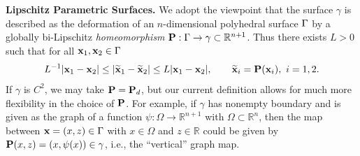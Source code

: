 \noindent
{\bf Lipschitz Parametric Surfaces.}
We adopt the viewpoint that the surface $\gamma$ is described as the deformation of an
$n$-dimensional polyhedral surface $\Gamma$ by a globally bi-Lipschitz
\emph{homeomorphism} ${\bf P}:\Gamma \rightarrow \gamma \subset \mathbb
R^{n+1}$. 
Thus there exists $L>0$ such that for all ${\bf x}_1, {\bf x}_2 \in \Gamma$
\begin{equation}
\label{surf_bi_lipschitz}
L^{-1} |{\bf x}_1-{\bf x}_2| \le |\widetilde{{\bf x}}_1 -\widetilde{{\bf x}}_2| \le L|{\bf x}_1-{\bf x}_2|, \qquad
\widetilde{{\bf x}}_i = {\bf P}({\bf x}_i), ~i=1,2.
\end{equation}
If $\gamma$ is $C^2$, we may take ${\bf P}={\bf P}_d$, but our current definition allows for much more flexibility in the choice of ${\bf P}$.  For example, if $\gamma$ has nonempty boundary and is given as the graph of a function $\psi:\Omega \rightarrow \mathbb{R}^{n+1}$ with $\Omega \subset \mathbb{R}^n$, then the map between ${\bf x}=(x,z) \in \Gamma$ with $x \in \Omega$ and $z \in \mathbb{R}$ could be given by ${\bf P}(x,z)=(x, \psi(x))\in\gamma$, i.e., the ``vertical'' graph map.  

